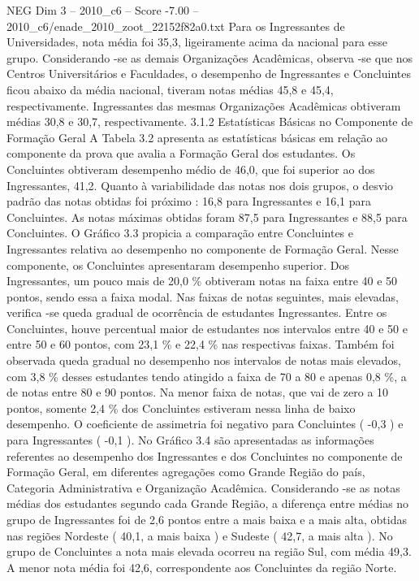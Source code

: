 \begin{textsample}{NEG Dim 3 – 2010\_c6 – Score -7.00 – 2010\_c6/enade\_2010\_zoot\_22152f82a0.txt}
Para os Ingressantes de Universidades, nota média foi 35,3, ligeiramente acima da nacional para esse grupo.
Considerando -se as demais Organizações Acadêmicas, observa -se que nos Centros Universitários e Faculdades, o desempenho de Ingressantes e Concluintes ficou abaixo da média nacional, tiveram notas médias 45,8 e 45,4, respectivamente.
Ingressantes das mesmas Organizações Acadêmicas obtiveram médias 30,8 e 30,7, respectivamente. 3.1.2 Estatísticas Básicas no Componente de Formação Geral A Tabela 3.2 apresenta as estatísticas básicas em relação ao componente da prova que avalia a Formação Geral dos estudantes.
Os Concluintes obtiveram desempenho médio de 46,0, que foi superior ao dos Ingressantes, 41,2.
Quanto à variabilidade das notas nos dois grupos, o desvio padrão das notas obtidas foi próximo : 16,8 para Ingressantes e 16,1 para Concluintes.
As notas máximas obtidas foram 87,5 para Ingressantes e 88,5 para Concluintes.
O Gráfico 3.3 propicia a comparação entre Concluintes e Ingressantes relativa ao desempenho no componente de Formação Geral.
Nesse componente, os Concluintes apresentaram desempenho superior.
Dos Ingressantes, um pouco mais de 20,0 \% obtiveram notas na faixa entre 40 e 50 pontos, sendo essa a faixa modal.
Nas faixas de notas seguintes, mais elevadas, verifica -se queda gradual de ocorrência de estudantes Ingressantes.
Entre os Concluintes, houve percentual maior de estudantes nos intervalos entre 40 e 50 e entre 50 e 60 pontos, com 23,1 \% e 22,4 \% nas respectivas faixas.
Também foi observada queda gradual no desempenho nos intervalos de notas mais elevados, com 3,8 \% desses estudantes tendo atingido a faixa de 70 a 80 e apenas 0,8 \%, a de notas entre 80 e 90 pontos.
Na menor faixa de notas, que vai de zero a 10 pontos, somente 2,4 \% dos Concluintes estiveram nessa linha de baixo desempenho.
O coeficiente de assimetria foi negativo para Concluintes ( -0,3 ) e para Ingressantes ( -0,1 ).
No Gráfico 3.4 são apresentadas as informações referentes ao desempenho dos Ingressantes e dos Concluintes no componente de Formação Geral, em diferentes agregações como Grande Região do país, Categoria Administrativa e Organização Acadêmica.
Considerando -se as notas médias dos estudantes segundo cada Grande Região, a diferença entre médias no grupo de Ingressantes foi de 2,6 pontos entre a mais baixa e a mais alta, obtidas nas regiões Nordeste ( 40,1, a mais baixa ) e Sudeste ( 42,7, a mais alta ).
No grupo de Concluintes a nota mais elevada ocorreu na região Sul, com média 49,3.
A menor nota média foi 42,6, correspondente aos Concluintes da região Norte.

\end{textsample}
